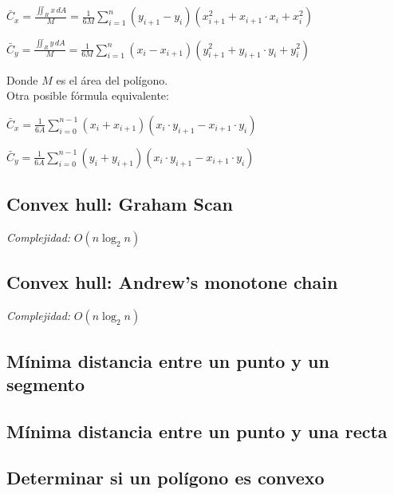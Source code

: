 \documentclass[10pt,letterpaper,twocolumn,twosided]{article}
\newcommand{\codigofuente}[1]{

\dotfill
}
\begin{document}
$ \displaystyle\bar{C}_{x} = \frac{ \displaystyle\iint_{R} x \, dA }{M} = \frac{1}{6M}\sum_{i=1}^{n} (y_{i+1} - y_{i}) (x_{i+1}^2 + x_{i+1} \cdot x_{i} + x_{i}^2) $

\medskip

$\displaystyle\bar{C}_{y} = \frac{ \displaystyle\iint_{R} y \, dA }{M} = \frac{1}{6M} \sum_{i=1}^{n} (x_{i} - x_{i+1}) (y_{i+1}^2 + y_{i+1} \cdot y_{i} + y_{i}^2)$

\medskip

Donde $ M $ es el área del polígono. \\

Otra posible fórmula equivalente:

$ \displaystyle\bar{C}_{x} = \frac{1}{6A} \sum_{i=0}^{n-1} (x_{i} + x_{i+1}) (x_{i} \cdot y_{i+1} - x_{i+1} \cdot y_{i}) $

\medskip

$ \displaystyle\bar{C}_{y} = \frac{1}{6A} \sum_{i=0}^{n-1} (y_{i} + y_{i+1}) (x_{i} \cdot y_{i+1} - x_{i+1} \cdot y_{i}) $


\subsection{Convex hull: Graham Scan}
\emph{Complejidad:} $ O(n \log_{2}{n}) $
\codigofuente{./src/geometria/grahamscan.cpp}

\subsection{Convex hull: Andrew's monotone chain}
\emph{Complejidad:} $ O(n \log_{2}{n}) $
\codigofuente{./src/geometria/monotonechain.cpp}

\subsection{Mínima distancia entre un punto y un segmento}
\codigofuente{./src/geometria/distance_point_to_segment.cpp}

\subsection{Mínima distancia entre un punto y una recta}
\codigofuente{./src/geometria/distance_point_to_line.cpp}

\subsection{Determinar si un polígono es convexo}
\codigofuente{./src/geometria/is_convex_polygon.cpp}
\end{document}
